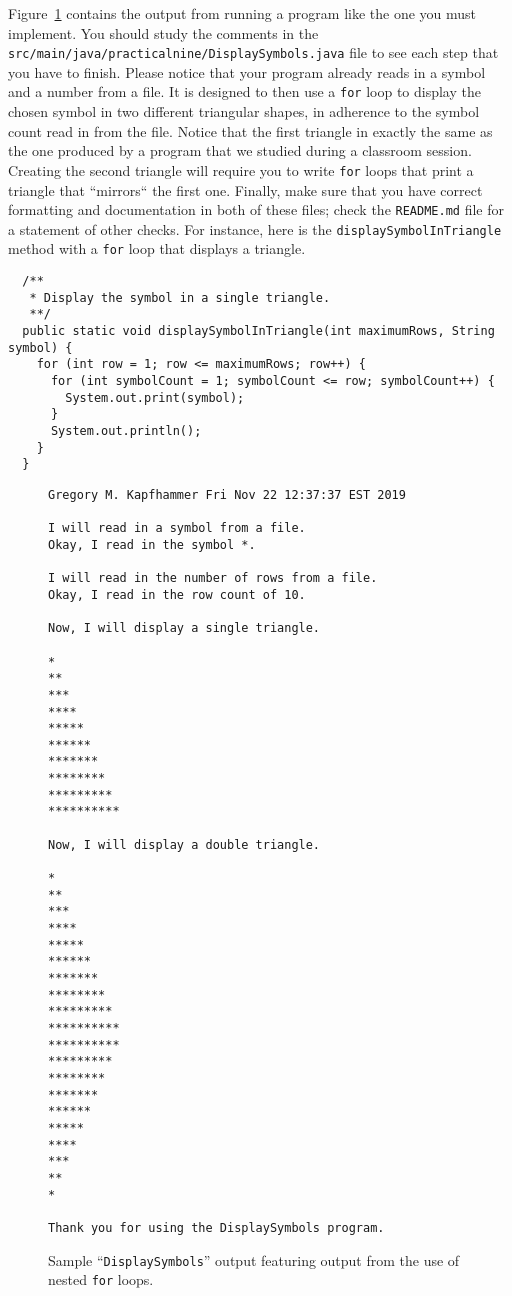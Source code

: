 \documentclass[11pt]{article}
\newcommand{\mainprogramsource}{\lstinline{src/main/java/practicalnine/DisplaySymbols.java}}
\newcommand{\program}[1]{\lstinline{#1}}
\begin{document}
Figure~\ref{fig:mad} contains the output from running a program like the one you
must implement. You should study the comments in the \mainprogramsource{} file
to see each step that you have to finish. Please notice that your program
already reads in a symbol and a number from a file. It is designed to then use a
\program{for} loop to display the chosen symbol in two different triangular
shapes, in adherence to the symbol count read in from the file. Notice that the
first triangle in exactly the same as the one produced by a program that we
studied during a classroom session. Creating the second triangle will require
you to write \program{for} loops that print a triangle that ``mirrors`` the
first one. Finally, make sure that you have correct formatting and documentation
in both of these files; check the {\tt README.md} file for a statement of other
checks.
%
For instance, here is the \program{displaySymbolInTriangle} method with a
\program{for} loop that displays a triangle.

\begin{verbatim}
  /**
   * Display the symbol in a single triangle.
   **/
  public static void displaySymbolInTriangle(int maximumRows, String symbol) {
    for (int row = 1; row <= maximumRows; row++) {
      for (int symbolCount = 1; symbolCount <= row; symbolCount++) {
        System.out.print(symbol);
      }
      System.out.println();
    }
  }
\end{verbatim}

\begin{figure}[tb]
\begin{Verbatim}[commandchars=\\\{\}]
Gregory M. Kapfhammer Fri Nov 22 12:37:37 EST 2019

I will read in a symbol from a file.
Okay, I read in the symbol *.

I will read in the number of rows from a file.
Okay, I read in the row count of 10.

Now, I will display a single triangle.

*
**
***
****
*****
******
*******
********
*********
**********

Now, I will display a double triangle.

*
**
***
****
*****
******
*******
********
*********
**********
**********
*********
********
*******
******
*****
****
***
**
*

Thank you for using the DisplaySymbols program.

\end{Verbatim}
\vspace*{-.1in}
\caption{Sample ``{\tt DisplaySymbols}'' output featuring output from the use of nested \program{for} loops.}
\label{fig:mad}
\end{figure}
\end{document}
